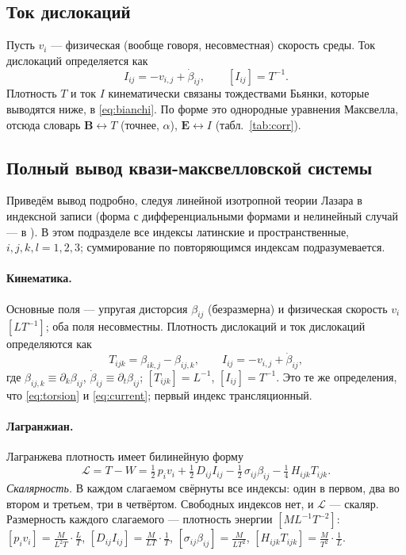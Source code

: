 \documentclass[12pt,a4paper]{article}
\begin{document}
\subsection{Ток дислокаций}
Пусть $v_i$ --- физическая (вообще говоря, несовместная) скорость среды. Ток
дислокаций определяется как \cite[ур.~(1)]{lazar2010pla}
\begin{equation}
I_{ij}=-v_{i,j}+\dot\beta_{ij},\qquad [I_{ij}]=T^{-1}.
\label{eq:current}
\end{equation}
Плотность $T$ и ток $I$ кинематически связаны тождествами Бьянки, которые
выводятся ниже, в \eqref{eq:bianchi}. По форме это однородные уравнения Максвелла,
отсюда словарь $\mathbf B\leftrightarrow T$ (точнее, $\alpha$), $\mathbf E\leftrightarrow I$
(табл.~\ref{tab:corr}).

\subsection{Полный вывод квази-максвелловской системы}
Приведём вывод подробно, следуя линейной изотропной теории Лазара в индексной
записи \cite{lazar2010pla} (форма с дифференциальными формами и нелинейный случай
--- в \cite{lazar2010}). В этом подразделе все индексы латинские и пространственные,
$i,j,k,l=1,2,3$; суммирование по повторяющимся индексам подразумевается.

\paragraph{Кинематика.} Основные поля --- упругая дисторсия $\beta_{ij}$
(безразмерна) и физическая скорость $v_i$ $[LT^{-1}]$; оба поля несовместны.
Плотность дислокаций и ток дислокаций определяются как \cite[ур.~(1)]{lazar2010pla}
\begin{equation}
T_{ijk}=\beta_{ik,j}-\beta_{ij,k},\qquad I_{ij}=-v_{i,j}+\dot\beta_{ij},
\label{eq:TI_lazar}
\end{equation}
где $\beta_{ij,k}\equiv\partial_k\beta_{ij}$, $\dot\beta_{ij}\equiv\partial_t\beta_{ij}$;
$[T_{ijk}]=L^{-1}$, $[I_{ij}]=T^{-1}$. Это те же определения, что \eqref{eq:torsion} и \eqref{eq:current}; первый индекс
трансляционный.

\paragraph{Лагранжиан.} Лагранжева плотность имеет билинейную форму
\cite[ур.~(3)]{lazar2010pla}
\begin{equation}
\mathcal{L}=T-W=\tfrac12\,p_iv_i+\tfrac12\,D_{ij}I_{ij}-\tfrac12\,\sigma_{ij}\beta_{ij}
-\tfrac14\,H_{ijk}T_{ijk}.
\label{eq:lagr}
\end{equation}
\textit{Скалярность.} В каждом слагаемом свёрнуты все индексы: один в первом, два во
втором и третьем, три в четвёртом. Свободных индексов нет, и $\mathcal L$ --- скаляр.
Размерность каждого слагаемого --- плотность энергии $[ML^{-1}T^{-2}]$:
$[p_iv_i]=\frac{M}{L^2T}\cdot\frac LT$, $[D_{ij}I_{ij}]=\frac M{LT}\cdot\frac1T$,
$[\sigma_{ij}\beta_{ij}]=\frac M{LT^2}$, $[H_{ijk}T_{ijk}]=\frac M{T^2}\cdot\frac1L$.
\end{document}
